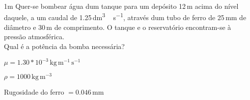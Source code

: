 \documentclass[\mainfilename]{subfiles}
\begin{document}
\begin{questionBox}1m{ %
    Quer-se bombear água dum tanque para um depósito 12\,\si{\metre} acima do nível daquele, a um caudal de 1.25\,\si{\deci\metre^3\,\second^{-1}}, através dum tubo de ferro de 25\,\si{\milli\metre} de diâmetro e 30\,\si{\metre} de comprimento. O tanque e o reservatório encontram-se à pressão atmosférica.\\
    Qual é a potência da bomba necessária?
} %
    
    \begin{itemize}
        \begin{multicols}{2}
            \item \( \mu  = 1.30*10^{-3}\,\si{\kilo\gram\,\metre^{-1}\,\second^{-1}} \)
            \item \( \rho = 1000\,\si{\kilo\gram\,\metre^{-3}}\)
            \item Rugosidade do ferro \(=0.046\,\si{\milli\metre}\)
        \end{multicols}
    \end{itemize}


\end{questionBox}
\end{document}
